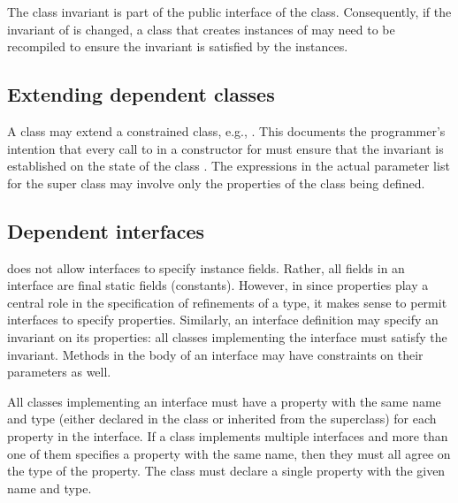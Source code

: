 The class invariant is part of the public interface of the
class.  Consequently, if the invariant of  is changed, a class
that creates instances of 
may need to be recompiled to ensure the invariant is satisfied
by the instances.



\subsection{Extending dependent classes}

A class may extend a constrained class, e.g.,
   .
This documents the programmer's intention that
every call to  in a constructor for  must ensure
that the invariant  is established on the state of the class
. The expressions in the actual parameter list for the super
class may involve only the properties of the class being defined.


\subsection{Dependent interfaces}

\java{} does not allow interfaces to specify instance fields.  Rather, all
fields in an interface are final static fields (constants).
However, in \Xten{}
since properties play a central role in the specification of
refinements of a type, it makes sense to permit interfaces to specify
properties.
Similarly, an interface
definition may specify an invariant on its properties: all
classes implementing the interface must satisfy the invariant.  Methods
in the body of an interface may have constraints on their
parameters as well.

All classes implementing an interface must have a property
with the same name and
type (either declared in the class or inherited from the superclass)
for each property in the interface. If a class implements
multiple interfaces and more than one of them specifies a property
with the same name, then they must all agree on the type of the
property. The class must declare a single property with the given name
and type.

